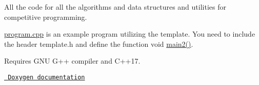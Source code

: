 All the code for all the algorithms and data structures and utilities for competitive programming.

\mbox{\hyperlink{program_8cpp}{program.\+cpp}} is an example program utilizing the template. You need to include the header template.\+h and define the function void \mbox{\hyperlink{main_8hpp_af095a232149097b5605064623a9345ac}{main2()}}.

Requires G\+NU G++ compiler and C++17.

\href{https://ramchandraapte.github.io/OmniTemplate/}{\texttt{ Doxygen documentation}} 